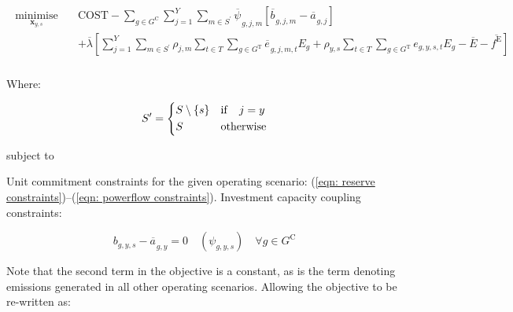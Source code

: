 \documentclass{article}
\newcommand{\sGeneratorsCandidate}{G^{\mathrm{C}}}
\newcommand{\sGeneratorsThermal}{G^{\mathrm{T}}}
\newcommand{\sYears}{Y}
\newcommand{\sScenarios}{S}
\newcommand{\sIntervals}{T}
\newcommand{\iGenerator}{g}
\newcommand{\iYear}{y}
\newcommand{\iYearAlias}{j}
\newcommand{\iScenario}{s}
\newcommand{\iScenarioAlias}{m}
\newcommand{\iInterval}{t}
\newcommand{\cScenarioDuration}[1][\iYear,\iScenario]{\rho_{#1}}
\newcommand{\cEmissionsIntensity}[1][\iGenerator]{E_{#1}}
\newcommand{\cEmmissionsCumulativeTarget}{\overline{E}}
\newcommand{\cObjectiveFunction}{\mathrm{COST}}
\newcommand{\vEnergy}[1][\iGenerator,\iYear,\iScenario,\iInterval]{e_{#1}}
\newcommand{\vEmissionsTargetViolation}{f^{\mathrm{E}}}
\newcommand{\vInstalledCapacityTotal}[1][\iGenerator,\iYear]{a_{#1}}
\newcommand{\vInstalledCapacityTotalScenario}[1][\iGenerator,\iYear,\iScenario]{b_{#1}}
\newcommand{\vFixedCapacityDual}[1][\iGenerator,\iYear,\iScenario]{\psi_{#1}}
\DeclareMathOperator*{\minimise}{minimise}
\begin{document}
\begin{align}
	\begin{split}
		\minimise\limits_{\bm{x}_{\iYear,\iScenario}} \quad &\cObjectiveFunction - \sum\limits_{\iGenerator \in \sGeneratorsCandidate}\sum\limits_{\iYearAlias=1}^{\sYears}\sum\limits_{\iScenarioAlias \in \sScenarios^{\prime}} \overline{\vFixedCapacityDual[]}_{\iGenerator,\iYearAlias,\iScenarioAlias}\left[\overline{\vInstalledCapacityTotalScenario[]}_{\iGenerator,\iYearAlias,\iScenarioAlias} - \overline{\vInstalledCapacityTotal[]}_{\iGenerator,\iYearAlias}\right]\\
		& + \overline{\lambda} \left[\sum\limits_{\iYearAlias=1}^{\sYears} \sum\limits_{\iScenarioAlias \in \sScenarios^{\prime}} \cScenarioDuration[\iYearAlias,\iScenarioAlias] \sum\limits_{\iInterval \in \sIntervals} \sum\limits_{\iGenerator \in \sGeneratorsThermal} \overline{\vEnergy[]}_{\iGenerator,\iYearAlias,\iScenarioAlias,\iInterval} \cEmissionsIntensity + \cScenarioDuration\sum\limits_{\iInterval \in \sIntervals}\sum\limits_{\iGenerator \in \sGeneratorsThermal} \vEnergy[\iGenerator,\iYear,\iScenario,\iInterval] \cEmissionsIntensity - \cEmmissionsCumulativeTarget - \overline{\vEmissionsTargetViolation}\right]\\
	\end{split}
\end{align}

Where:

\begin{equation}
	\sScenarios^{\prime} = 
	\begin{dcases}
	\sScenarios \setminus \{\iScenario\} & \mathrm{if} \quad \iYearAlias = \iYear\\
	\sScenarios & \mathrm{otherwise}\\
	\end{dcases}
\end{equation}

subject to

Unit commitment constraints for the given operating scenario: (\ref{eqn: reserve constraints})--(\ref{eqn: powerflow constraints}). Investment capacity coupling constraints:

\begin{equation}
\vInstalledCapacityTotalScenario - \overline{\vInstalledCapacityTotal[]}_{\iGenerator,\iYear} = 0 \quad (\vFixedCapacityDual) \quad \forall \iGenerator \in \sGeneratorsCandidate
\label{eqn: fixed candidate capacity constraint}
\end{equation}

Note that the second term in the objective is a constant, as is the term denoting emissions generated in all other operating scenarios. Allowing the objective to be re-written as:
\end{document}
